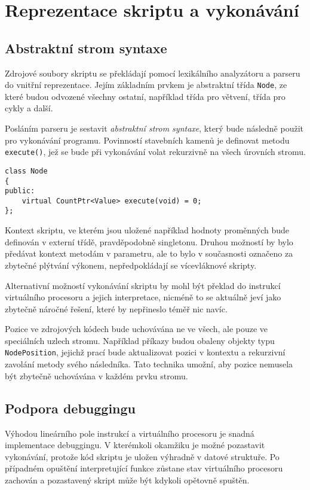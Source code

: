 \documentclass[11pt,twoside,a4paper]{book}
\begin{document}
\section{Reprezentace skriptu a vykonávání}

\subsection{Abstraktní strom syntaxe}

Zdrojové soubory skriptu se překládají pomocí lexikálního analyzátoru a parseru do vnitřní reprezentace. Jejím základním prvkem je abstraktní třída \texttt{Node}, ze které budou odvozené všechny ostatní, například třída pro větvení, třída pro cykly a další.

Posláním parseru je sestavit \textit{abstraktní strom syntaxe}, který bude následně použit pro vykonávání programu. Povinností stavebních kamenů je definovat metodu \texttt{execute()}, jež se bude při vykonávání volat rekurzivně na všech úrovních stromu.

\begin{verbatim}
class Node
{
public:
    virtual CountPtr<Value> execute(void) = 0;
};
\end{verbatim}

Kontext skriptu, ve kterém jsou uložené například hodnoty proměnných bude definován v externí třídě, pravděpodobně singletonu. Druhou možností by bylo předávat kontext metodám v parametru, ale to bylo v současnosti označeno za zbytečné plýtvání výkonem, nepředpokládají se vícevláknové skripty.

Alternativní možností vykonávání skriptu by mohl být překlad do instrukcí virtuálního procesoru a jejich interpretace, nicméně to se aktuálně jeví jako zbytečně náročné řešení, které by nepřineslo téměř nic navíc.

Pozice ve zdrojových kódech bude uchovávána ne ve všech, ale pouze ve speciálních uzlech stromu. Například příkazy budou obaleny objekty typu \texttt{NodePosition}, jejichž prací bude aktualizovat pozici v kontextu a rekurzivní zavolání metody svého následníka. Tato technika umožní, aby pozice nemusela být zbytečně uchovávána v každém prvku stromu.


\subsection{Podpora debuggingu}

Výhodou lineárního pole instrukcí a virtuálního procesoru je snadná implementace debuggingu. V kterémkoli okamžiku je možné pozastavit vykonávání, protože kód skriptu je uložen výhradně v datové struktuře. Po případném opuštění interpretující funkce zůstane stav virtuálního procesoru zachován a pozastavený skript může být kdykoli opětovně spuštěn.
\end{document}
